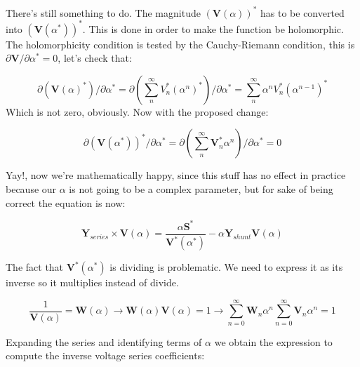 \documentclass[11pt,fleqn]{book} %
\begin{document}
\begin{theorem}

	There's still something to do. The magnitude $\left(\textbf{V}( \alpha )\right)^*$ has to be converted into $\left(\textbf{V}( \alpha^* )\right)^*$. This is done in order to make the function be holomorphic. The holomorphicity condition is tested by the Cauchy-Riemann condition, this is $\partial \textbf{V} / \partial \alpha^* = 0$, let's check that:
	
	\begin{equation}
	\partial \left(\textbf{V}( \alpha )^*\right) / \partial \alpha^*  = \partial \left(\sum_{n}^{\infty} V_n^* (\alpha ^n)^*\right) / \partial \alpha^*  = \sum_{n}^{\infty} \alpha ^n V_n^* (\alpha ^{n-1})^*
	\end{equation} 
	Which is not zero, obviously. Now with the proposed change:
	
	\begin{equation}
	\partial \left( \textbf{V}( \alpha^* )\right)^* / \partial \alpha^*  = \partial \left(\sum_{n}^{\infty} \textbf{V}_n^* \alpha ^n \right) / \partial \alpha^*  = 0
	\end{equation} 
	
	Yay!, now we're mathematically happy, since this stuff has no effect in practice because our $\alpha$ is not going to be a complex parameter, but for sake of being correct the equation is now:
	
	\begin{equation}
	{\textbf{Y}_{series}\times \textbf{V}( \alpha )} = \frac{ \alpha\textbf{S}^*}{\textbf{V}^*( \alpha^* )} - \alpha \textbf{Y}_{shunt} \textbf{V}( \alpha )
	\label{base_eq_embedded2}
	\end{equation}

\end{theorem}


The fact that $\textbf{V}^*( \alpha^* )$ is dividing is problematic. We need to express it as its inverse so it multiplies instead of divide.

\begin{equation} 
\frac{1}{\textbf{V}( \alpha)} = \textbf{W}( \alpha ) \longrightarrow \textbf{W}( \alpha ) \textbf{V}( \alpha) = 1 \longrightarrow \sum_{n=0}^{\infty}{\textbf{W}_n \alpha^n}  \sum_{n=0}^{\infty}{\textbf{V}_n \alpha^n} = 1
\end{equation}

Expanding the series and identifying terms of $\alpha$ we obtain the expression to compute the inverse voltage series coefficients:
\end{document}
